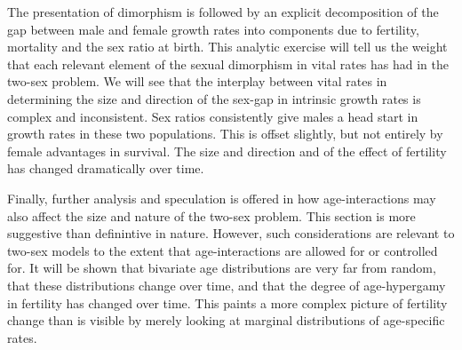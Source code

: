 The presentation of dimorphism is followed by an explicit decomposition of the
gap between male and female growth rates into components due to fertility,
mortality and the sex ratio at birth. This analytic exercise will tell us the
weight that each relevant element of the sexual dimorphism in vital rates has
had in the two-sex problem. We will see that the interplay between vital rates
in determining the size and direction of the sex-gap in intrinsic growth rates
is complex and inconsistent. Sex ratios consistently give males a head start in
growth rates in these two populations. This is offset slightly, but not entirely
by female advantages in survival. The size and direction and of the effect of
fertility has changed dramatically over time.

Finally, further analysis and speculation is offered in how age-interactions may
also affect the size and nature of the two-sex problem. This section is more
suggestive than definintive in nature. However, such considerations are relevant
to two-sex models to the extent that age-interactions are allowed for or
controlled for. It will be shown that bivariate age distributions are very far
from random, that these distributions change over time, and that the degree of
age-hypergamy in fertility has changed over time. This paints a more complex
picture of fertility change than is visible by merely looking at marginal
distributions of age-specific rates.









